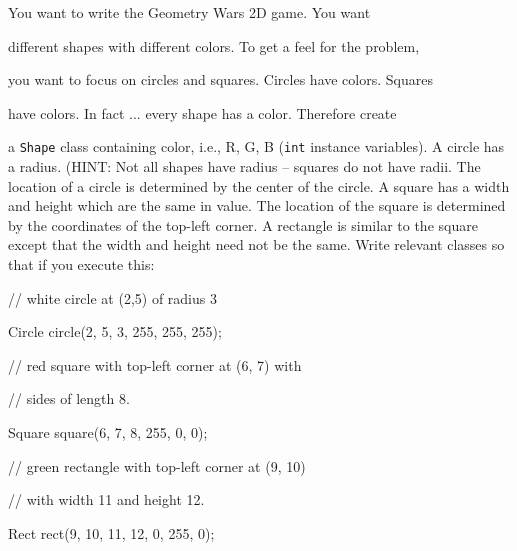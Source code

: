You want to write the Geometry Wars 2D game. You want

different shapes with different colors. To get a feel for the problem,

you want to focus on circles and squares. Circles have colors. Squares

have colors. In fact ... every shape has a color. Therefore create

a \verb!Shape! class containing color, i.e., R, G, B (\verb!int! instance variables). A circle has a radius. (HINT: Not all shapes have radius -- squares do not have radii. The location of a circle is determined by the center of the circle. A square has a width and height which are the same in value. The location of the square is determined by the coordinates of the top-left corner. A rectangle is similar to the square except that the width and height need not be the same. Write relevant classes so that if you execute this:

\begin{console}

// white circle at (2,5) of radius 3

Circle circle(2, 5, 3, 255, 255, 255);



// red square with top-left corner at (6, 7) with

// sides of length 8.

Square square(6, 7, 8, 255, 0, 0);



// green rectangle with top-left corner at (9, 10)

// with width 11 and height 12.

Rect rect(9, 10, 11, 12, 0, 255, 0);

\end{console}

